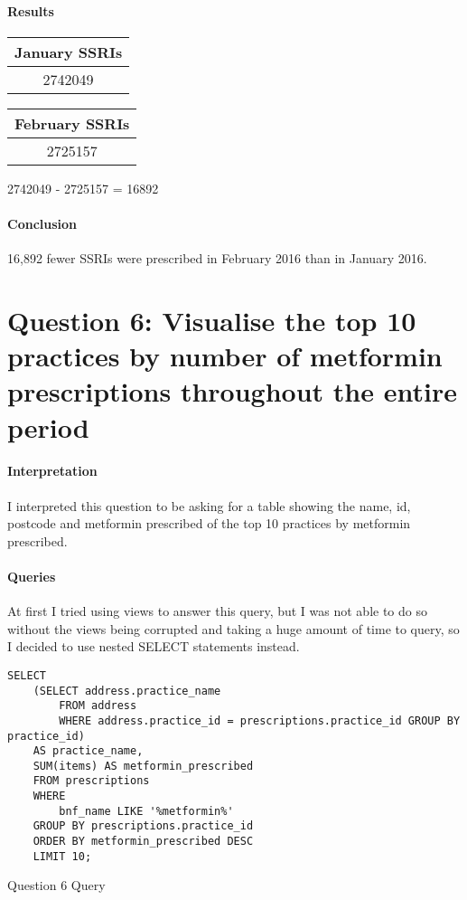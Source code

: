 \documentclass{report}
\begin{document}
\paragraph{Results}
\begin{center}
\begin{tabular}{ | c | }
\hline
January SSRIs \\
\hline
2742049\\
\hline
\end{tabular}
\end{center}

\begin{center}
\begin{tabular}{ | c | }
\hline
February SSRIs \\
\hline
2725157 \\
\hline
\end{tabular}
\end{center}

2742049 - 2725157 = 16892
\paragraph{Conclusion}
16,892 fewer SSRIs were prescribed in February 2016 than in January 2016.

\section{Question 6: Visualise the top 10 practices by number of metformin prescriptions throughout the entire period}
\paragraph{Interpretation}
I interpreted this question to be asking for a table showing the name, id, postcode and metformin prescribed of the top 10 practices by metformin prescribed.
\paragraph{Queries}
At first I tried using views to answer this query, but I was not able to do so without the views being corrupted and taking a huge amount of time to query, so I decided to use nested SELECT statements instead.

\begin{listing}[H]
\begin{verbatim}
SELECT 
	(SELECT address.practice_name 
		FROM address 
		WHERE address.practice_id = prescriptions.practice_id GROUP BY practice_id) 
	AS practice_name, 
	SUM(items) AS metformin_prescribed 
	FROM prescriptions 
	WHERE 
		bnf_name LIKE '%metformin%' 
	GROUP BY prescriptions.practice_id 
	ORDER BY metformin_prescribed DESC 
	LIMIT 10;
\end{verbatim}
\caption{Question 6 Query}
\label{lst: Q6-1}
\end{listing}
\end{document}
